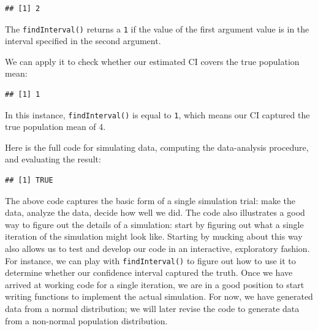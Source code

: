 \documentclass[
]{book}
\newenvironment{Shaded}{\begin{snugshade}}{\end{snugshade}}
\newcommand{\AttributeTok}[1]{\textcolor[rgb]{0.13,0.29,0.53}{#1}}
\newcommand{\CommentTok}[1]{\textcolor[rgb]{0.56,0.35,0.01}{\textit{#1}}}
\newcommand{\DecValTok}[1]{\textcolor[rgb]{0.00,0.00,0.81}{#1}}
\newcommand{\FunctionTok}[1]{\textcolor[rgb]{0.13,0.29,0.53}{\textbf{#1}}}
\newcommand{\NormalTok}[1]{#1}
\newcommand{\OtherTok}[1]{\textcolor[rgb]{0.56,0.35,0.01}{#1}}
\newcommand{\SpecialCharTok}[1]{\textcolor[rgb]{0.81,0.36,0.00}{\textbf{#1}}}
\begin{document}
\begin{verbatim}
## [1] 2
\end{verbatim}

The \texttt{findInterval()} returns a \texttt{1} if the value of the first argument value is in the interval specified in the second argument.

We can apply it to check whether our estimated CI covers the true population mean:

\begin{Shaded}
\end{Shaded}

\begin{verbatim}
## [1] 1
\end{verbatim}

In this instance, \texttt{findInterval()} is equal to \texttt{1}, which means our CI captured the true population mean of 4.

Here is the full code for simulating data, computing the data-analysis procedure, and evaluating the result:

\begin{Shaded}
\end{Shaded}

\begin{verbatim}
## [1] TRUE
\end{verbatim}

The above code captures the basic form of a single simulation trial: make the data, analyze the data, decide how well we did.
The code also illustrates a good way to figure out the details of a simulation: start by figuring out what a single iteration of the simulation might look like.
Starting by mucking about this way also allows us to test and develop our code in an interactive, exploratory fashion. For instance, we can play with \texttt{findInterval()} to figure out how to use it to determine whether our confidence interval captured the truth.
Once we have arrived at working code for a single iteration, we are in a good position to start writing functions to implement the actual simulation.
For now, we have generated data from a normal distribution; we will later revise the code to generate data from a non-normal population distribution.
\end{document}
